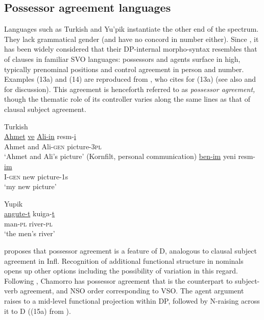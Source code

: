 \documentclass[output=paper
,modfonts
,nonflat]{langsci/langscibook}
\begin{document}
\subsection{Possessor agreement languages}
Languages such as Turkish and Yu'pik instantiate the other end of the spectrum. They lack grammatical gender (and have no concord in number either). Since \citet{Abney1987}, it has been widely considered that their DP-internal morpho-syntax resembles that of clauses in familiar SVO languages: possessors and agents surface in high, typically prenominal positions and control agreement in person and number. Examples (13a) and (14) are reproduced from \citet{Abney1987}, who cites \citet{Underhill1976} for (13a) (see also \citealt{Gavruseva2000} and \citealt{Haegeman2004b} for discussion). This agreement is henceforth referred to as \textit{possessor agreement,} though the thematic role of its controller varies along the same lines as that of clausal subject agreement. 

\begin{exe}
	\ex Turkish\\
	\xlist
	\ex 
	\gll \underline{Ahmet} \underline{ve} \underline{Ali-in}     resm-\underline{i}  \\
	Ahmet and Ali-\textsc{gen}   picture-3\textsc{pl}\\
	\glt `Ahmet and Ali's picture'  	
	\ex (Kornfilt, personal communication) \newline
	\gll \underline{ben-im}   yeni  resm-\underline{im}\\
	I-\textsc{gen}  new   picture-1s\\
	\glt `my new picture'
	\endxlist
\end{exe}

\begin{exe}
	\ex Yupik\\
	\gll \underline{angute-t}		kuiga-\underline{t}\\
	man-\textsc{pl}    river-\textsc{pl}\\
	\glt `the men's river'  	
\end{exe}
\citet{Abney1987} proposes that possessor agreement is a feature of D, analogous to clausal subject agreement in Infl. Recognition of additional functional structure in nominals opens up other options including the possibility of variation in this regard. Following \citet{Chung1982}, Chamorro has possessor agreement that is the counterpart to subject-verb agreement, and NSO order corresponding to VSO. The agent argument raises to a mid-level functional projection within DP, followed by N-raising across it to D ((15a) from \citealt[127]{Chung1982}).
\end{document}
